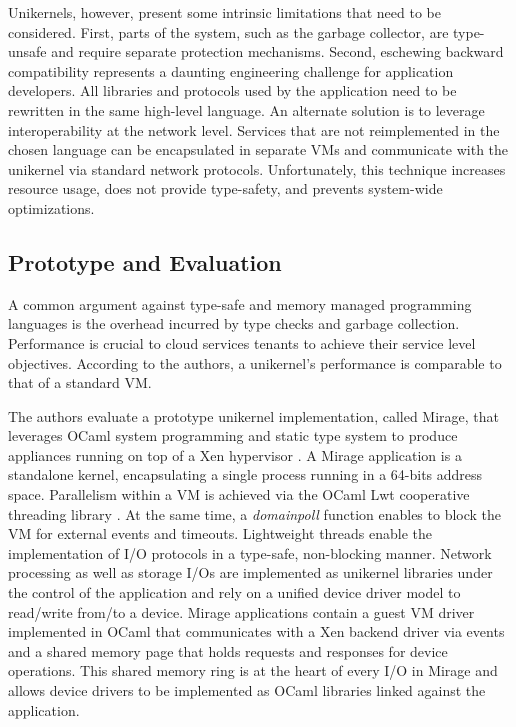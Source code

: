 Unikernels, however, present some intrinsic limitations that need to be considered.
First, parts of the system, such as the garbage collector, are type-unsafe and require separate protection mechanisms.
Second, eschewing backward compatibility represents a daunting engineering challenge for application developers.
All libraries and protocols used by the application need to be rewritten in the same high-level language.
An alternate solution is to leverage interoperability at the network level.
Services that are not reimplemented in the chosen language can be encapsulated in separate VMs and communicate with the unikernel via standard network protocols.
Unfortunately, this technique increases resource usage, does not provide type-safety, and prevents system-wide optimizations.


\subsection{Prototype and Evaluation}

A common argument against type-safe and memory managed programming languages is the overhead incurred by type checks and garbage collection.
Performance is crucial to cloud services tenants to achieve their service level objectives.
According to the authors, a unikernel's performance is comparable to that of a standard VM.

The authors evaluate a prototype unikernel implementation, called Mirage, that leverages OCaml system programming and static type system to produce appliances running on top of a Xen hypervisor \cite{DBLP:conf/sosp/BarhamDFHHHN03}.
A Mirage application is a standalone kernel, encapsulating a single process running in a 64-bits address space.
Parallelism within a VM is achieved via the OCaml Lwt cooperative threading library \cite{DBLP:conf/ml/Vouillon08}.
At the same time, a \emph{domainpoll} function enables to block the VM for external events and timeouts.
Lightweight threads enable the implementation of I/O protocols in a type-safe, non-blocking manner.
Network processing as well as storage I/Os are implemented as unikernel libraries under the control of the application and rely on a unified device driver model to read/write from/to a device.
Mirage applications contain a guest VM driver implemented in OCaml that communicates with a Xen backend driver via events and a shared memory page that holds requests and responses for device operations.
This shared memory ring is at the heart of every I/O in Mirage and allows device drivers to be implemented as OCaml libraries linked against the application.

